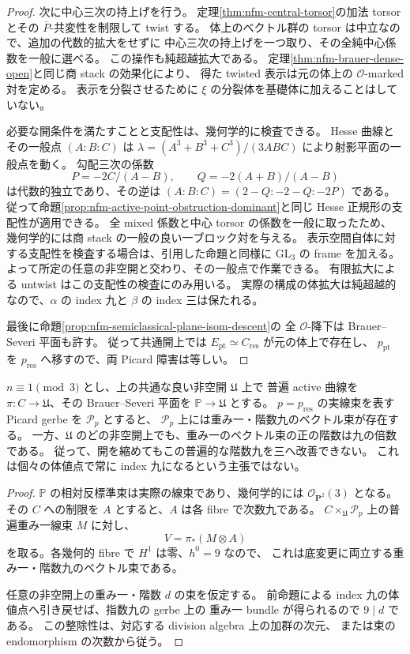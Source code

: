 \begin{proof}
次に中心三次の持上げを行う。
定理\ref{thm:nfm-central-torsor}の加法 torsor とその
$\overline P$-共変性を制限して twist する。
体上のベクトル群の torsor は中立なので、追加の代数的拡大をせずに
中心三次の持上げを一つ取り、その全純中心係数を一般に選べる。
この操作も純超越拡大である。
定理\ref{thm:nfm-brauer-dense-open}と同じ商 stack の効果化により、
得た twisted 表示は元の体上の $\mathcal O$-marked 対を定める。
表示を分裂させるために $\xi$ の分裂体を基礎体に加えることはしていない。

必要な開条件を満たすことと支配性は、幾何学的に検査できる。
Hesse 曲線とその一般点 $(A:B:C)$ は
$\lambda=(A^3+B^3+C^3)/(3ABC)$ により射影平面の一般点を動く。
勾配三次の係数
\[
 P=-2C/(A-B),\qquad Q=-2(A+B)/(A-B)
\]
は代数的独立であり、その逆は
$(A:B:C)=(2-Q:-2-Q:-2P)$ である。
従って命題\ref{prop:nfm-active-point-obstruction-dominant}と同じ
Hesse 正規形の支配性が適用できる。
全 mixed 係数と中心 torsor の係数を一般に取ったため、
幾何学的には商 stack の一般の良い一ブロック対を与える。
表示空間自体に対する支配性を検査する場合は、引用した命題と同様に
$\mathrm{GL}_3$ の frame を加える。
よって所定の任意の非空開と交わり、その一般点で作業できる。
有限拡大による untwist はこの支配性の検査にのみ用いる。
実際の構成の体拡大は純超越的なので、$\alpha$ の index 九と
$\beta$ の index 三は保たれる。

最後に命題\ref{prop:nfm-semiclassical-plane-isom-descent}の
全 $\mathcal O$-降下は Brauer--Severi 平面も許す。
従って共通開上では $E_{\mathrm{pt}}\simeq C_{\mathrm{res}}$ が元の体上で存在し、
$p_{\mathrm{pt}}$ を $p_{\mathrm{res}}$ へ移すので、両 Picard 障害は等しい。
\end{proof}

\begin{corollary}
\label{cor:nfm-universal-unsplit-picard-rank-nine}
$n\equiv1\pmod3$ とし、上の共通な良い非空開 $\mathfrak U$ 上で
普遍 active 曲線を $\pi:C\to\mathfrak U$、その Brauer--Severi 平面を
$\mathbb P\to\mathfrak U$ とする。
$p=p_{\mathrm{res}}$ の実線束を表す Picard gerbe を $\mathscr P_p$ とすると、
$\mathscr P_p$ 上には重み一・階数九のベクトル束が存在する。
一方、$\mathfrak U$ のどの非空開上でも、重み一のベクトル束の正の階数は九の倍数である。
従って、開を縮めてもこの普遍的な階数九を三へ改善できない。
これは個々の体値点で常に index 九になるという主張ではない。
\end{corollary}

\begin{proof}
$\mathbb P$ の相対反標準束は実際の線束であり、幾何学的には
$\mathcal O_{\mathbf P^2}(3)$ となる。
その $C$ への制限を $A$ とすると、$A$ は各 fibre で次数九である。
$C\times_{\mathfrak U}\mathscr P_p$ 上の普遍重み一線束 $M$ に対し、
\[
 V=\pi_*(M\otimes A)
\]
を取る。各幾何的 fibre で $H^1$ は零、$h^0=9$ なので、
これは底変更に両立する重み一・階数九のベクトル束である。

任意の非空開上の重み一・階数 $d$ の束を仮定する。
前命題による index 九の体値点へ引き戻せば、指数九の gerbe 上の
重み一 bundle が得られるので $9\mid d$ である。
この整除性は、対応する division algebra 上の加群の次元、
または束の endomorphism の次数から従う。
\end{proof}

